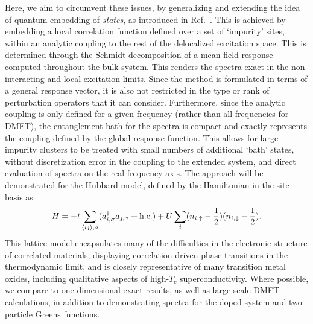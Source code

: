 \documentclass[aps,showpacs,twocolumn,nobibnotes]{revtex4}
\begin{document}
Here, we aim to circumvent these issues, by generalizing and extending the idea of quantum embedding of {\em states}, as introduced in 
Ref.~. This is achieved by embedding a local correlation function defined over a set of `impurity' sites, within an 
analytic coupling to the rest of the delocalized excitation space. This is determined through the Schmidt decomposition of a mean-field 
response computed throughout the bulk system. This renders the spectra exact in the non-interacting and local excitation limits. 
Since the method is formulated in terms of a general response vector, it is also not restricted in the type or rank of perturbation 
operators that it can consider. Furthermore, since the analytic coupling is only defined for a given frequency (rather than all frequencies 
for DMFT), the entanglement bath for the spectra is compact and exactly represents the coupling defined by the global response function. This 
allows for large impurity clusters to be treated with small numbers of additional `bath' states, without discretization error in the coupling 
to the extended system, and direct evaluation of spectra on the real frequency axis. The approach will be demonstrated for the Hubbard model, 
defined by the Hamiltonian in the site basis as
\begin{equation}
H = -t \sum_{\langle ij \rangle, \sigma} (a_{i,\sigma}^{\dagger}a_{j,\sigma} + \text{\textnormal {h.c.}}) + U \sum_i (n_{i,\uparrow} - \frac{1}{2})(n_{i,\downarrow} - \frac{1}{2})  . \label{eqn:hub}
\end{equation}
This lattice model encapsulates many of the difficulties in the electronic structure of correlated materials, displaying correlation driven 
phase transitions in the thermodynamic limit, and is closely representative of many transition metal oxides\cite{Limelette2003}, including qualitative aspects 
of high-$T_c$ superconductivity\cite{Millis2013,Anderson87}. Where possible, we compare to one-dimensional exact results\cite{Lieb68,Ovchinni1970}, as 
well as large-scale DMFT calculations\cite{Go2009,Kotliar2008}, in addition to demonstrating spectra for the doped system and two-particle Greens functions.
\end{document}
